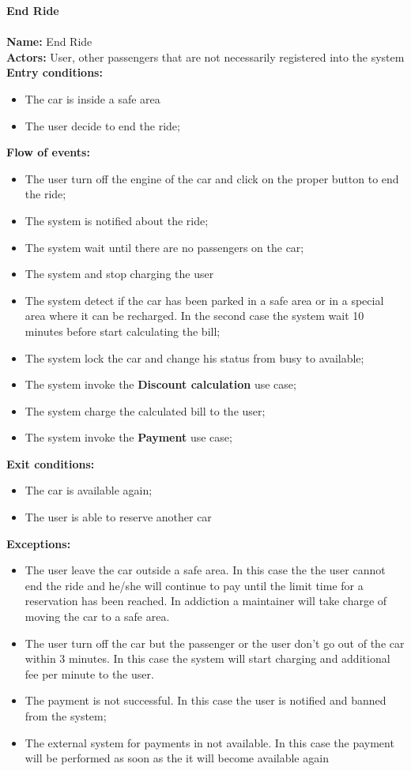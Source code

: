 \textbf{End Ride}\\
\\
\textbf{Name:} End Ride\\
\textbf{Actors:} User, other passengers that are not necessarily registered into the system\\
\textbf{Entry conditions:}
\begin{itemize}
\item The car is inside a safe area
\item The user decide to end the ride;
\end{itemize}
\textbf{Flow of events:}
\begin{itemize}
\item The user turn off the engine of the car and click on the proper button to end the ride;
\item The system is notified about the ride;
\item The system wait until there are no passengers on the car;
\item The system and stop charging the user
\item The system detect if the car has been parked in a safe area or in a special area where it can be recharged. In the second case the system wait 10 minutes before start calculating the bill;
\item The system lock the car and change his status from busy to available;
\item The system invoke the \textbf{Discount calculation} use case;
\item The system charge the calculated bill to the user;
\item The system invoke the \textbf{Payment} use case;
\end{itemize}
\textbf{Exit conditions:}
\begin{itemize}
\item The car is available again;
\item The user is able to reserve another car
\end{itemize}
\textbf{Exceptions:}
\begin{itemize}
\item The user leave the car outside a safe area. In this case the the user cannot end the ride and he/she will continue to pay until the limit time for a reservation has been reached. In addiction a maintainer will take charge of moving the car to a safe area.
\item The user turn off the car but the passenger or the user don't go out of the car within 3 minutes. In this case the system will start charging and additional fee per minute to the user.
\item The payment is not successful. In this case the user is notified and banned from the system;
\item The external system for payments in not available. In this case the payment will be performed as soon as the it will become available again
\end{itemize}



 





